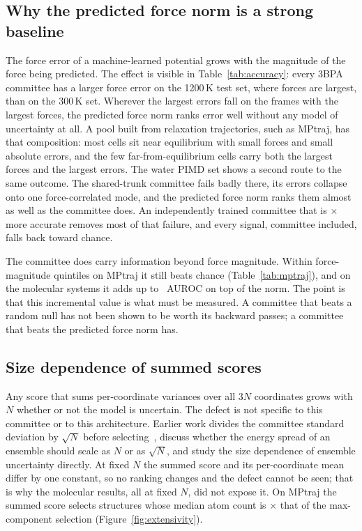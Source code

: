 \subsection{Why the predicted force norm is a strong baseline}

The force error of a machine-learned potential grows with the magnitude of the
force being predicted. The effect is visible in Table~\ref{tab:accuracy}: every
3BPA committee has a larger force error on the 1200\,K test set, where forces
are largest, than on the 300\,K set. Wherever the largest errors fall on the
frames with the largest forces, the predicted force norm ranks error well
without any model of uncertainty at all. A pool built from relaxation
trajectories, such as MPtraj, has that composition: most cells sit near
equilibrium with small forces and small absolute errors, and the few
far-from-equilibrium cells carry both the largest forces and the largest
errors. The water PIMD set shows a second route to the same outcome. The
shared-trunk committee fails badly there, its errors collapse onto one
force-correlated mode, and the predicted force norm ranks them almost as well as
the committee does. An independently trained committee that is
\fsNaiveAccuracyRatio$\times$ more accurate removes most of that failure, and
every signal, committee included, falls back toward chance.

The committee does carry information beyond force magnitude. Within
force-magnitude quintiles on MPtraj it still beats chance
(Table~\ref{tab:mptraj}), and on the molecular systems it adds up to
\fsCompFixedHi\ AUROC on top of the norm. The point is that this incremental
value is what must be measured. A committee that beats a random null has not
been shown to be worth its backward passes; a committee that beats the
predicted force norm has.

\subsection{Size dependence of summed scores}

Any score that sums per-coordinate variances over all $3N$ coordinates grows
with $N$ whether or not the model is uncertain. The defect is not specific to
this committee or to this architecture. Earlier work divides the committee
standard deviation by $\sqrt{N}$ before selecting~\citep{smith2018less},
\citet{kellner2024shallow} discuss whether the energy spread of an ensemble
should scale as $N$ or as $\sqrt{N}$, and \citet{lortaraprasert2026size} study
the size dependence of ensemble uncertainty directly. At fixed $N$ the summed
score and its per-coordinate mean differ by one constant, so no ranking changes
and the defect cannot be seen; that is why the molecular results, all at fixed
$N$, did not expose it. On MPtraj the summed score selects structures whose
median atom count is \fsMPtrajExtensivity$\times$ that of the max-component
selection (Figure~\ref{fig:extensivity}).


